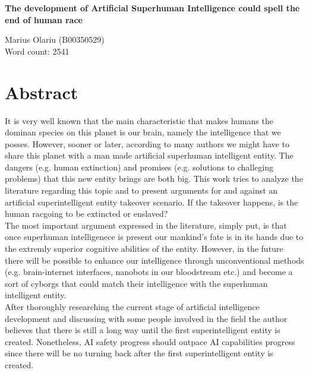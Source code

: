 \documentclass[11pt]{article}
\begin{document}
	
	\begin{titlepage}
    \centering
    \vspace*{\fill}

    \vspace*{0.5cm}

    \huge\bfseries
		The development of Artificial Superhuman Intelligence could spell the end of human race
    \vspace*{0.5cm}

	\large Marius Olariu (B00350529)\\ Word count: 2541

    \vspace*{\fill}
    \end{titlepage}

\section*{Abstract}
	It is very well known that the main characteristic that makes humans the dominan species on this planet is our brain, namely the intelligence that we posses. However, sooner or later, according to many authors we might have to share this planet with a man made artificial superhuman intelligent entity. The dangers (e.g. human extinction) and promises (e.g. solutions to challeging problems) that this new entity brings are both big. This work tries to analyze the literature regarding this topic and to present arguments for and against an artificial superintelligent entity takeover scenario. If the takeover happens, is the human racgoing to be extincted or enslaved?\\
	\indent
	The most important argument expressed in the literature, simply put, is that once superhuman intelligenece is present our mankind's fate is in its hands due to the extremly superior cognitive abilities of the entity. However, in the future there will be possible to enhance our intelligence through unconventional methods (e.g. brain-internet interfaces, nanobots in our bloodstream etc.) and become a sort of cyborgs that could match their intelligence with the superhuman intelligent entity. 	   \\
	\indent
	After thoroughly researching the current stage of artificial intelligence development and discussing with some people involved in the field the author believes that there is still a long way until the first superintelligent entity is created. Nonetheless, AI safety progress should outpace AI capabilities progress since there will be no turning back after the first superintelligent entity is created.
 
\end{document}
